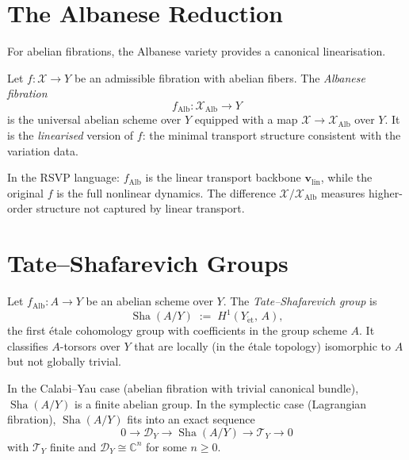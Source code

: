 \documentclass[11pt,openany]{book}
\newcommand{\Sha}{\operatorname{Sha}}
\begin{document}
\section{The Albanese Reduction}
\label{sec:albanese}

For abelian fibrations, the Albanese variety provides a
canonical linearisation.

\begin{definition}
Let $f : \mathcal{X} \to Y$ be an admissible fibration
with abelian fibers.  The \emph{Albanese fibration}
\[
  f_{\mathrm{Alb}} : \mathcal{X}_{\mathrm{Alb}} \to Y
\]
is the universal abelian scheme over $Y$ equipped with a
map $\mathcal{X} \to \mathcal{X}_{\mathrm{Alb}}$ over $Y$.
It is the \emph{linearised} version of $f$: the minimal
transport structure consistent with the variation data.
\end{definition}

\begin{remark}
In the RSVP language: $f_{\mathrm{Alb}}$ is the linear
transport backbone $\boldsymbol{v}_{\mathrm{lin}}$, while
the original $f$ is the full nonlinear dynamics.  The
difference $\mathcal{X} / \mathcal{X}_{\mathrm{Alb}}$
measures higher-order structure not captured by linear
transport.
\end{remark}

\section{Tate--Shafarevich Groups}
\label{sec:ts-groups}

\begin{definition}
Let $f_{\mathrm{Alb}} : A \to Y$ be an abelian scheme
over $Y$.  The \emph{Tate--Shafarevich group} is
\[
  \Sha(A/Y) \;:=\; H^1(Y_{\mathrm{\acute{e}t}},\, A),
\]
the first étale cohomology group with coefficients in the
group scheme $A$.  It classifies $A$-torsors over $Y$
that are locally (in the étale topology) isomorphic to
$A$ but not globally trivial.
\end{definition}

\begin{proposition}
\label{prop:sha-finite}
In the Calabi--Yau case (abelian fibration with trivial
canonical bundle), $\Sha(A/Y)$ is a finite abelian group.
In the symplectic case (Lagrangian fibration), $\Sha(A/Y)$
fits into an exact sequence
\[
  0 \to \mathcal{D}_Y \to \Sha(A/Y) \to \mathcal{T}_Y \to 0
\]
with $\mathcal{T}_Y$ finite and $\mathcal{D}_Y \cong
\mathbb{C}^n$ for some $n \ge 0$.
\end{proposition}
\end{document}
